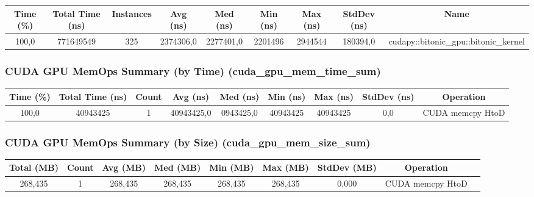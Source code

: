\documentclass[a4paper, 12pt, oneside]{article}
\begin{document}
\begin{center}
  \begin{adjustbox}{width=1\textwidth}
    \begin{tabular}{ |c|c|c|c|c|c|c|c|c| }
      \hline
      Time (\%) & Total Time (ns) & Instances & Avg (ns)  & Med (ns)  & Min (ns) & Max (ns) & StdDev (ns) & Name                                  \\
      \hline
      100,0     & 771649549       & 325       & 2374306,0 & 2277401,0 & 2201496  & 2944544  & 180394,0    & cudapy::bitonic\_gpu::bitonic\_kernel \\
      \hline
    \end{tabular}
  \end{adjustbox}
\end{center}

\subsubsection{CUDA GPU MemOps Summary (by Time) (cuda\_gpu\_mem\_time\_sum)}

\begin{center}
  \begin{adjustbox}{width=1\textwidth}
    \begin{tabular}{ |c|c|c|c|c|c|c|c|c| }
      \hline
      Time (\%) & Total Time (ns) & Count & Avg (ns)   & Med (ns)  & Min (ns) & Max (ns) & StdDev (ns) & Operation        \\
      \hline
      100,0     & 40943425        & 1     & 40943425,0 & 0943425,0 & 40943425 & 40943425 & 0,0         & CUDA memcpy HtoD \\
      \hline
    \end{tabular}
  \end{adjustbox}
\end{center}

\subsubsection{CUDA GPU MemOps Summary (by Size) (cuda\_gpu\_mem\_size\_sum)}

\begin{center}
  \begin{adjustbox}{width=1\textwidth}
    \begin{tabular}{ |c|c|c|c|c|c|c|c|c| }
      \hline
      Total (MB) & Count & Avg (MB) & Med (MB) & Min (MB) & Max (MB) & StdDev (MB) & Operation        \\
      \hline
      268,435    & 1     & 268,435  & 268,435  & 268,435  & 268,435  & 0,000       & CUDA memcpy HtoD \\
      \hline
    \end{tabular}
  \end{adjustbox}
\end{center}
\end{document}
